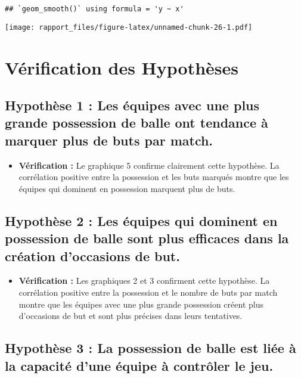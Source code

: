 \documentclass[
]{article}
\providecommand{\tightlist}{%
  \setlength{\itemsep}{0pt}\setlength{\parskip}{0pt}}
\begin{document}
\begin{verbatim}
## `geom_smooth()` using formula = 'y ~ x'
\end{verbatim}

\texttt{[image: rapport\_files/figure-latex/unnamed-chunk-26-1.pdf]}

\section{Vérification des
Hypothèses}\label{vuxe9rification-des-hypothuxe8ses}

\subsection{Hypothèse 1 : Les équipes avec une plus grande possession de
balle ont tendance à marquer plus de buts par
match.}\label{hypothuxe8se-1-les-uxe9quipes-avec-une-plus-grande-possession-de-balle-ont-tendance-uxe0-marquer-plus-de-buts-par-match.}

\begin{itemize}
\tightlist
\item
  \textbf{Vérification :} Le graphique 5 confirme clairement cette
  hypothèse. La corrélation positive entre la possession et les buts
  marqués montre que les équipes qui dominent en possession marquent
  plus de buts.
\end{itemize}

\subsection{Hypothèse 2 : Les équipes qui dominent en possession de
balle sont plus efficaces dans la création d'occasions de
but.}\label{hypothuxe8se-2-les-uxe9quipes-qui-dominent-en-possession-de-balle-sont-plus-efficaces-dans-la-cruxe9ation-doccasions-de-but.}

\begin{itemize}
\tightlist
\item
  \textbf{Vérification :} Les graphiques 2 et 3 confirment cette
  hypothèse. La corrélation positive entre la possession et le nombre de
  buts par match montre que les équipes avec une plus grande possession
  créent plus d'occasions de but et sont plus précises dans leurs
  tentatives.
\end{itemize}

\subsection{Hypothèse 3 : La possession de balle est liée à la capacité
d'une équipe à contrôler le
jeu.}\label{hypothuxe8se-3-la-possession-de-balle-est-liuxe9e-uxe0-la-capacituxe9-dune-uxe9quipe-uxe0-contruxf4ler-le-jeu.}
\end{document}
